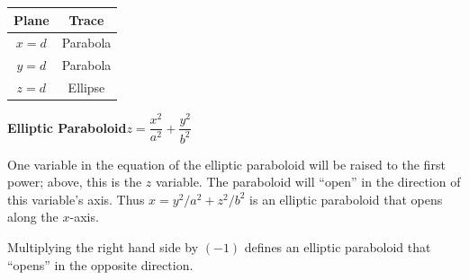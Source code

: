 \noindent
\begin{minipage}{\linewidth}
 \captionsetup{type=figure}%
 \noindent%
 \begin{minipage}[c]{.35\linewidth}
 \end{minipage}%
 \begin{minipage}[c]{.2\linewidth}
  \begin{tabular}{cc}
   \textbf{Plane}  & \textbf{Trace} \\\midrule
   $x=d$ & Parabola \\
   $y=d$ & Parabola \\
   $z=d$ & Ellipse
  \end{tabular}
 \end{minipage}%
 \begin{minipage}[c]{.45\linewidth}
 \end{minipage}
 \caption{\quad\textbf{Elliptic Paraboloid}\qquad$z=\dfrac{x^2}{a^2}+\dfrac{y^2}{b^2}$}
 \label{fig_elliptic_paraboloid}
 \bigskip
 \begin{minipage}{.75\linewidth}
  One variable in the equation of the elliptic paraboloid will be raised to the first power; above, this is the $z$ variable. The paraboloid will ``open'' in the direction of this variable's axis. Thus $x= y^2/a^2+z^2/b^2$ is an elliptic paraboloid that opens along the $x$-axis.\bigskip

  Multiplying the right hand side by $(-1)$ defines an elliptic paraboloid that ``opens'' in the opposite direction.
 \end{minipage}
\end{minipage}

\vfill
\noindent\hrulefill
\vfill

